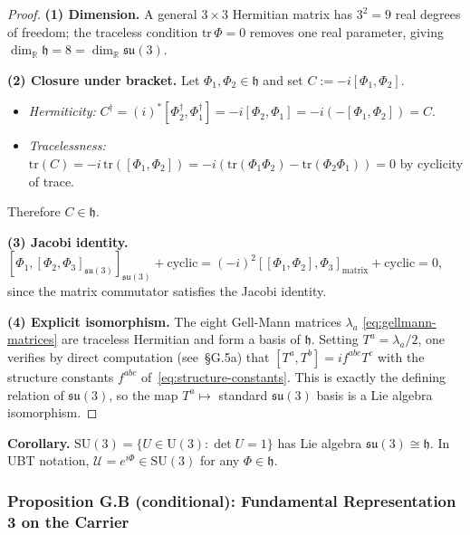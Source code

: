 \begin{proof}
\textbf{(1) Dimension.}
A general $3\times3$ Hermitian matrix has $3^2=9$ real degrees of freedom;
the traceless condition $\mathrm{tr}\,\Phi=0$ removes one real parameter, giving
$\dim_\mathbb{R}\mathfrak{h}=8=\dim_\mathbb{R}\mathfrak{su}(3)$.

\medskip
\textbf{(2) Closure under bracket.}
Let $\Phi_1,\Phi_2\in\mathfrak{h}$ and set $C := -i[\Phi_1,\Phi_2]$.
\begin{itemize}
  \item \emph{Hermiticity:}
    $C^\dagger = (i)^*[\Phi_2^\dagger,\Phi_1^\dagger] = -i[\Phi_2,\Phi_1] = -i(-[\Phi_1,\Phi_2]) = C$.
  \item \emph{Tracelessness:}
    $\mathrm{tr}(C) = -i\,\mathrm{tr}([\Phi_1,\Phi_2]) = -i(\mathrm{tr}(\Phi_1\Phi_2)-\mathrm{tr}(\Phi_2\Phi_1))=0$
    by cyclicity of trace.
\end{itemize}
Therefore $C\in\mathfrak{h}$.

\medskip
\textbf{(3) Jacobi identity.}
$[\Phi_1,[\Phi_2,\Phi_3]_{\mathfrak{su}(3)}]_{\mathfrak{su}(3)} + \mathrm{cyclic}
= (-i)^2[[\Phi_1,\Phi_2],\Phi_3]_{\mathrm{matrix}}+\mathrm{cyclic}=0$,
since the matrix commutator satisfies the Jacobi identity.

\medskip
\textbf{(4) Explicit isomorphism.}
The eight Gell-Mann matrices $\lambda_a$ \eqref{eq:gellmann-matrices} are traceless Hermitian
and form a basis of $\mathfrak{h}$.  Setting $T^a=\lambda_a/2$, one verifies by direct computation
(see~\S G.5a) that $[T^a,T^b]=if^{abc}T^c$ with the structure constants $f^{abc}$
of~\eqref{eq:structure-constants}.  This is exactly the defining relation of $\mathfrak{su}(3)$,
so the map $T^a \mapsto$ standard $\mathfrak{su}(3)$ basis is a Lie algebra isomorphism.
\end{proof}

\begin{tcolorbox}[colback=blue!3!white,colframe=blue!40!black]
\textbf{Corollary.}
$\mathrm{SU}(3)=\{U\in\mathrm{U}(3):\det U=1\}$ has Lie algebra $\mathfrak{su}(3)\cong\mathfrak{h}$.
In UBT notation, $\mathcal{U}=e^{i\Phi}\in\mathrm{SU}(3)$ for any $\Phi\in\mathfrak{h}$.
\end{tcolorbox}

\subsubsection*{Proposition G.B (conditional): Fundamental Representation $\mathbf{3}$ on the Carrier}

